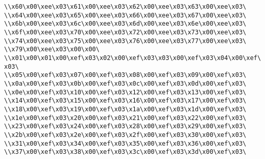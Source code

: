 \verb|\\x60\x00\xee\x03\x61\x00\xee\x03\x62\x00\xee\x03\x63\x00\xee\x03\|\newline
\verb|\\x64\x00\xee\x03\x65\x00\xee\x03\x66\x00\xee\x03\x67\x00\xee\x03\|\newline
\verb|\\x6b\x00\xee\x03\x6c\x00\xee\x03\x6d\x00\xee\x03\x6e\x00\xee\x03\|\newline
\verb|\\x6f\x00\xee\x03\x70\x00\xee\x03\x72\x00\xee\x03\x73\x00\xee\x03\|\newline
\verb|\\x74\x00\xee\x03\x75\x00\xee\x03\x76\x00\xee\x03\x77\x00\xee\x03\|\newline
\verb|\\x79\x00\xee\x03\x00\x00\|\newline
\verb|\\x01\x00\x01\x00\xef\x03\x02\x00\xef\x03\x03\x00\xef\x03\x04\x00\xef\x03\|\newline
\verb|\\x05\x00\xef\x03\x07\x00\xef\x03\x08\x00\xef\x03\x09\x00\xef\x03\|\newline
\verb|\\x0a\x00\xef\x03\x0b\x00\xef\x03\x0c\x00\xef\x03\x0d\x00\xef\x03\|\newline
\verb|\\x0e\x00\xef\x03\x10\x00\xef\x03\x12\x00\xef\x03\x13\x00\xef\x03\|\newline
\verb|\\x14\x00\xef\x03\x15\x00\xef\x03\x16\x00\xef\x03\x17\x00\xef\x03\|\newline
\verb|\\x18\x00\xef\x03\x19\x00\xef\x03\x1a\x00\xef\x03\x1d\x00\xef\x03\|\newline
\verb|\\x1e\x00\xef\x03\x20\x00\xef\x03\x21\x00\xef\x03\x22\x00\xef\x03\|\newline
\verb|\\x23\x00\xef\x03\x24\x00\xef\x03\x28\x00\xef\x03\x29\x00\xef\x03\|\newline
\verb|\\x2b\x00\xef\x03\x2e\x00\xef\x03\x2f\x00\xef\x03\x30\x00\xef\x03\|\newline
\verb|\\x31\x00\xef\x03\x34\x00\xef\x03\x35\x00\xef\x03\x36\x00\xef\x03\|\newline
\verb|\\x37\x00\xef\x03\x38\x00\xef\x03\x3c\x00\xef\x03\x3d\x00\xef\x03\|\newline
